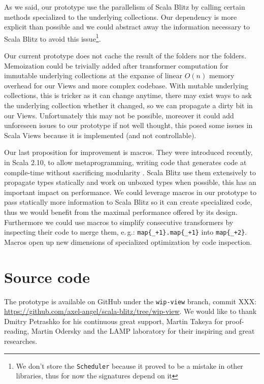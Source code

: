 \documentclass[a4paper,12pt,twocolumn]{article}
\newcommand{\eg}{e.\,g.}
\begin{document}
As we said, our prototype use the parallelism of Scala Blitz by calling certain methods specialized to the underlying collections.
Our dependency is more explicit than possible and we could abstract away the information necessary to Scala Blitz to avoid this issue\footnote{We don't store the {\tt Scheduler} because it proved to be a mistake in other libraries, thus for now the signatures depend on it}.


Our current prototype does not cache the result of the folders nor the folders.
Memoization could be trivially added after transformer computation for immutable underlying collections at the expanse of linear $O(n)$ memory overhead for our Views and more complex codebase.
With mutable underlying collections, this is tricker as it can change anytime, there may exist ways to ask the underlying collection whether it changed, so we can propagate a dirty bit in our Views.
Unfortunately this may not be possible, moreover it could add unforeseen issues to our prototype if not well thought, this posed some issues in Scala Views because it is implemented (and not controllable).

Our last proposition for improvement is macros.
They were introduced recently, in Scala 2.10, to allow metaprogramming, writing code that generates code at compile-time without sacrificing modularity \cite{scala-macros}.
Scala Blitz use them extensively to propagate types statically and work on unboxed types when possible, this has an important impact on performance.
We could leverage macros in our prototype to pass statically more information to Scala Blitz so it can create specialized code, thus we would benefit from the maximal performance offered by its design.
Furthermore we could use macros to simplify consecutive transformers by inspecting their code to merge them, \eg: \verb|map{_+1}.map{_+1}| into \verb|map{_+2}|.
Macros open up new dimensions of specialized optimization by code inspection.

\appendix
\section{Source code}
The prototype is available on GitHub under the \verb|wip-view| branch, commit XXX:
\url{https://github.com/axel-angel/scala-blitz/tree/wip-view}.
We would like to thank Dmitry Petrashko for his continuous great support, Martin Takeya for proof-reading, Martin Odersky and the LAMP laboratory for their inspiring and great researches.


{}


\nocite{scala-bitrot}
\end{document}
